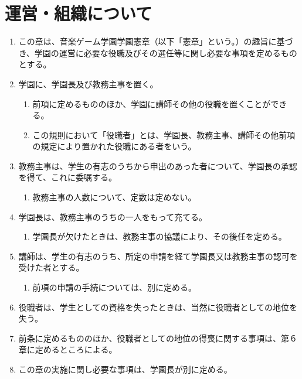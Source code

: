 \newpage
\chapter{運営・組織について}
\begin{enumerate}[label=第\arabic*条　]
  \item この章は、音楽ゲーム学園学園憲章（以下「憲章」という。）の趣旨に基づき、学園の運営に必要な役職及びその選任等に関し必要な事項を定めるものとする。
  \item 学園に、学園長及び教務主事を置く。
    \begin{enumerate}[label=\arabic*　,start=2,leftmargin=*]
      \item 前項に定めるもののほか、学園に講師その他の役職を置くことができる。
      \item この規則において「役職者」とは、学園長、教務主事、講師その他前項の規定により置かれた役職にある者をいう。
    \end{enumerate}
  \item 教務主事は、学生の有志のうちから申出のあった者について、学園長の承認を得て、これに委嘱する。
    \begin{enumerate}[label=\arabic*　,start=2,leftmargin=*]
      \item 教務主事の人数について、定数は定めない。
    \end{enumerate}
  \item 学園長は、教務主事のうちの一人をもって充てる。
    \begin{enumerate}[label=\arabic*　,start=2,leftmargin=*]
      \item 学園長が欠けたときは、教務主事の協議により、その後任を定める。
    \end{enumerate}
  \item 講師は、学生の有志のうち、所定の申請を経て学園長又は教務主事の認可を受けた者とする。
    \begin{enumerate}[label=\arabic*　,start=2,leftmargin=*]
      \item 前項の申請の手続については、別に定める。
    \end{enumerate}
  \item 役職者は、学生としての資格を失ったときは、当然に役職者としての地位を失う。
  \item 前条に定めるもののほか、役職者としての地位の得喪に関する事項は、第６章に定めるところによる。
  \item この章の実施に関し必要な事項は、学園長が別に定める。
\end{enumerate}